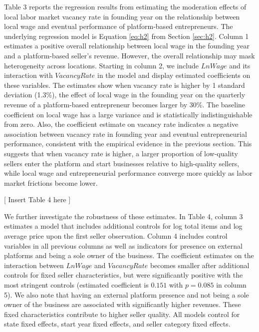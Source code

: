 \documentclass[letterpaper,12pt]{article}
\begin{document}
Table 3 reports the regression results from estimating the moderation effects of local labor market vacancy rate in founding year on the relationship between local wage and eventual performance of platform-based entrepreneurs. The underlying regression model is Equation \ref{eq:h2} from Section \ref{sec:h2}. Column 1 estimates a positive overall relationship between local wage in the founding year and a platform-based seller's revenue. However, the overall relationship may mask heterogeneity across locations. Starting in column 2, we include $LnWage$ and its interaction with $VacancyRate$ in the model and display estimated coefficients on these variables. The estimates show when vacancy rate is higher by 1 standard deviation (1.3\%), the effect of local wage in the founding year on the quarterly revenue of a platform-based entrepreneur becomes larger by 30\%. The baseline coefficient on local wage has a large variance and is statistically indistinguishable from zero. Also, the coefficient estimate on vacancy rate indicates a negative association between vacancy rate in founding year and eventual entrepreneurial performance, consistent with the empirical evidence in the previous section. This suggests that when vacancy rate is higher, a larger proportion of low-quality sellers enter the platform and start businesses relative to high-quality sellers, while local wage and entrepreneurial performance converge more quickly as labor market frictions become lower. 

\begin{center}
[ Insert Table 4 here ]
\end{center}

We further investigate the robustness of these estimates. In Table 4, column 3 estimates a model that includes additional controls for log total items and log average price upon the first seller observation. Column 4 includes control variables in all previous columns as well as indicators for presence on external platforms and being a sole owner of the business. The coefficient estimates on the interaction between $LnWage$ and $VacancyRate$ becomes smaller after additional controls for fixed seller characteristics, but were significantly positive with the most stringent controls (estimated coefficient is $0.151$ with $p=0.085$ in column 5). We also note that having an external platform presence and not being a sole owner of the business are associated with significantly higher revenues. These fixed characteristics contribute to higher seller quality. All models control for state fixed effects, start year fixed effects, and seller category fixed effects.
\end{document}
